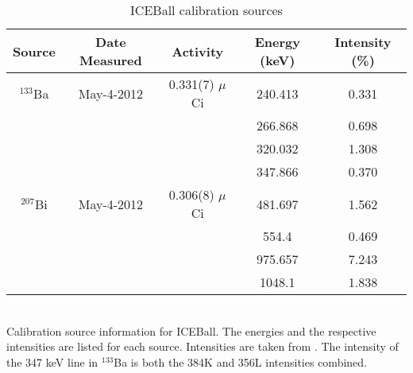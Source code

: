 \begin{table}[]
    \centering
    \caption{ICEBall calibration sources}
        \label{tab:ICE_Cal_Source}
    \begin{tabular}{c|c|c|c|c} \toprule
         Source & Date Measured & Activity & Energy (keV) & Intensity (\%)\\
          \hline 
         $^{133}$Ba & May-4-2012 & 0.331(7) $\mu$Ci & 240.413 & 0.331 \\
         & & & 266.868 & 0.698 \\
         & & & 320.032 & 1.308 \\
         & & & 347.866 & 0.370 \\
         \hline
         $^{207}$Bi & May-4-2012 & 0.306(8) $\mu$Ci & 481.697 & 1.562 \\ 
         & & & 554.4 & 0.469 \\
         & & & 975.657 & 7.243 \\
         & & & 1048.1 & 1.838 \\\bottomrule
    \end{tabular}
    \\[2]
    \footnotesize
    Calibration source information for ICEBall. The energies and the respective intensities are listed for each source. Intensities are taken from \cite{trzaska90:_calibration}. The intensity of the 347 keV line in $^{133}$Ba is both the 384K and 356L intensities combined.
\end{table}